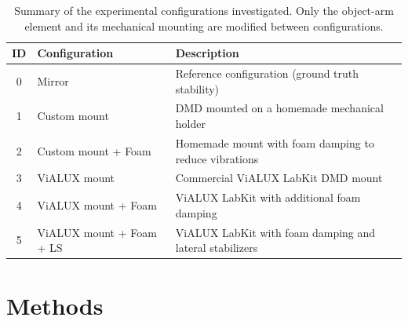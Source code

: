 \documentclass[11pt,a4paper]{article}
\begin{document}
\begin{table}[H]
	\centering
	\begin{tabular}{@{}cll@{}}
		\toprule
		\textbf{ID} & \textbf{Configuration}   & \textbf{Description}                                    \\ \midrule
		0           & Mirror                   & Reference configuration (ground truth stability)        \\
		1           & Custom mount             & DMD mounted on a homemade mechanical holder             \\
		2           & Custom mount + Foam      & Homemade mount with foam damping to reduce vibrations   \\
		3           & ViALUX mount             & Commercial ViALUX LabKit DMD mount                      \\
		4           & ViALUX mount + Foam      & ViALUX LabKit with additional foam damping              \\
		5           & ViALUX mount + Foam + LS & ViALUX LabKit with foam damping and lateral stabilizers \\ \bottomrule
	\end{tabular}
	\caption{Summary of the experimental configurations investigated. Only the object-arm element and its mechanical mounting are modified between configurations.}
	\label{tab:conditions}
\end{table}

\section{Methods}
\end{document}

